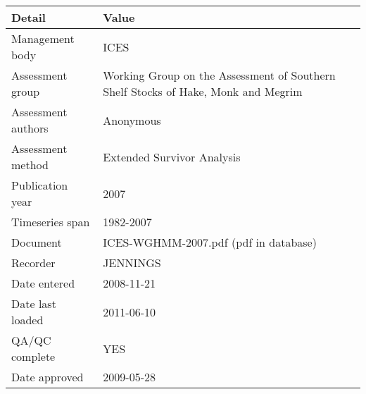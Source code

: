 \begin{table}[htb]
\centering
\begin{tabular}{lp{7cm}}
\toprule
Detail & Value \\
\midrule
Management body    & ICES                                                                              \\
Assessment group   & Working Group on the Assessment of Southern Shelf Stocks of Hake, Monk and Megrim \\
Assessment authors & Anonymous                                                                         \\
Assessment method  & Extended Survivor Analysis                                                        \\
Publication year   & 2007                                                                              \\
Timeseries span    & 1982-2007                                                                         \\
Document           & ICES-WGHMM-2007.pdf (pdf in database)                                             \\
Recorder           & JENNINGS                                                                          \\
Date entered       & 2008-11-21                                                                        \\
Date last loaded   & 2011-06-10                                                                        \\
QA/QC complete     & YES                                                                               \\
Date approved      & 2009-05-28                                                                        \\
\bottomrule
\end{tabular}
\label{tab:assessdet}
\end{table}

